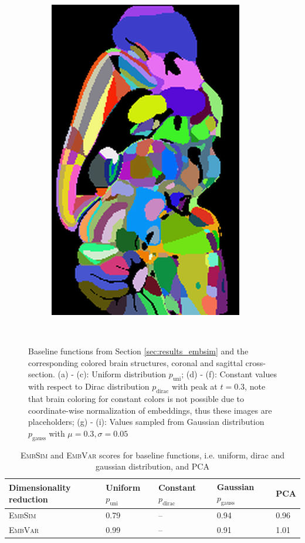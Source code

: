 \documentclass[]{article}
\begin{document}
\begin{figure}
\begin{subfigure}{0.3\textwidth}
		\includegraphics[width=.67\linewidth, angle=270]{../results/random_noise__ano_sagittal_50_res_slice_1.png}
		\caption{}
	\end{subfigure}\\
	\caption[Baseline functions from Section \ref{sec:results_embsim}]{Baseline functions from Section \ref{sec:results_embsim} and the corresponding colored brain structures, coronal and sagittal cross-section. (a) - (c): Uniform distribution $p_\text{uni}$; (d) - (f): Constant values with respect to Dirac distribution $p_\text{dirac}$ with peak at $t=0.3$, note that brain coloring for constant colors is not possible due to coordinate-wise normalization of embeddings, thus these images are placeholders; (g) - (i): Values sampled from Gaussian distribution $p_\text{gauss}$ with $\mu=0.3, \sigma=0.05$}
	\label{fig:baseline_distributions}
\end{figure}

\begin{table}
	\centering
	\renewcommand{\arraystretch}{1.5}
	\begin{tabular}{|l|llll|}
		\hline
		Dimensionality reduction&Uniform $p_\text{uni}$ &Constant $p_\text{dirac}$&Gaussian $p_\text{gauss}$&PCA\\
		\hline
		\textsc{EmbSim}&0.79& -- & 0.94&0.96\\
		\textsc{EmbVar}&0.99& -- & 0.91 & 1.01\\ 
		\hline
		
	\end{tabular}

	\caption{\textsc{EmbSim} and \textsc{EmbVar} scores for baseline functions, i.e. uniform, dirac and gaussian distribution, and PCA }
	\label{tab:dim_red_results}
\end{table}
\end{document}
